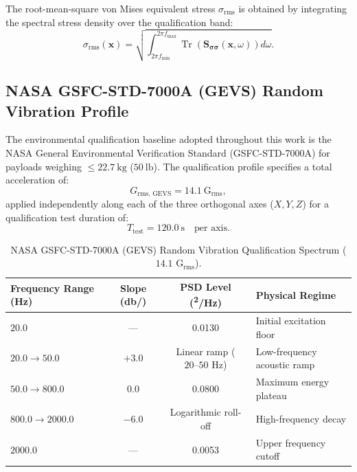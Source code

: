 The root-mean-square von Mises equivalent stress $\sigma_{\text{rms}}$ is obtained by integrating the spectral stress density over the qualification band:
\begin{equation}
\sigma_{\text{rms}}(\mathbf{x}) = \sqrt{\int_{2\pi f_{\min}}^{2\pi f_{\max}} \operatorname{Tr}\left(\mathbf{S}_{\boldsymbol{\sigma}\boldsymbol{\sigma}}(\mathbf{x}, \omega)\right) d\omega}.
\label{eq:rms_stress_integral}
\end{equation}

\subsection{NASA GSFC-STD-7000A (GEVS) Random Vibration Profile}

The environmental qualification baseline adopted throughout this work is the NASA General Environmental Verification Standard (GSFC-STD-7000A) for payloads weighing $\le \SI{22.7}{\kilo\gram}$ ($\SI{50}{\text{lb}}$). The qualification profile specifies a total acceleration of:
\begin{equation}
G_{\text{rms, GEVS}} = \SI{14.1}{\text{G}_{\text{rms}}},
\end{equation}
applied independently along each of the three orthogonal axes ($X, Y, Z$) for a qualification test duration of:
\begin{equation}
T_{\text{test}} = \SI{120.0}{\second} \quad \text{per axis}.
\end{equation}

\begin{table}[htbp]
\centering
\caption{NASA GSFC-STD-7000A (GEVS) Random Vibration Qualification Spectrum ($14.1\text{ G}_{\text{rms}}$).}
\label{tab:gevs_profile}
\begin{tabular}{l c S[table-format=1.4] l}
\toprule
\textbf{Frequency Range (\si{\hertz})} & \textbf{Slope (\si{\decibel/})} & {\textbf{PSD Level (\si{^2/\hertz})}} & \textbf{Physical Regime} \\
\midrule
$20.0$ & — & 0.0130 & Initial excitation floor \\
$20.0 \to 50.0$ & $+3.0$ & {Linear ramp ($20\text{--}50\text{ Hz}$)} & Low-frequency acoustic ramp \\
$50.0 \to 800.0$ & $0.0$ & 0.0800 & Maximum energy plateau \\
$800.0 \to 2000.0$ & $-6.0$ & {Logarithmic roll-off} & High-frequency decay \\
$2000.0$ & — & 0.0053 & Upper frequency cutoff \\
\bottomrule
\end{tabular}
\end{table}

